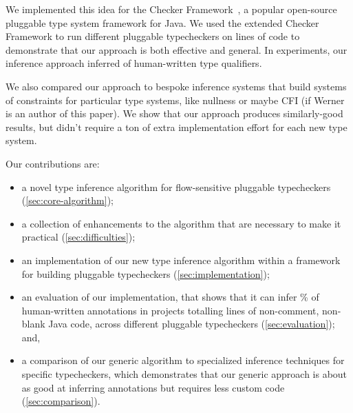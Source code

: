We implemented this idea for the Checker Framework~\cite{PapiACPE2008},
a popular open-source pluggable type system
framework for Java.
%
%
We used the extended Checker Framework to run  different pluggable typecheckers
on  lines of code to demonstrate that
our approach is both effective and general.
In experiments, our inference approach inferred  of human-written
type qualifiers.

We also compared our approach to bespoke inference systems that build
systems of constraints for particular type systems, like nullness or
maybe CFI (if Werner is an author of this paper). We show that our approach
produces similarly-good results, but didn't require a ton of extra
implementation effort for each new type system.

Our contributions are:
\begin{itemize}
\item a novel type inference algorithm for flow-sensitive pluggable
  typecheckers (\cref{sec:core-algorithm});
\item a collection of enhancements to the algorithm that are necessary to
  make it practical (\cref{sec:difficulties});
\item an implementation of our new type inference algorithm within a framework
  for building pluggable typecheckers (\cref{sec:implementation});
\item an evaluation of our implementation, that shows that it can infer
  \% of human-written annotations in  projects totalling
   lines of non-comment, non-blank Java code, across  different
  pluggable typecheckers (\cref{sec:evaluation}); and,
\item a comparison of our generic algorithm to specialized inference
  techniques for specific typecheckers, which demonstrates that our generic
  approach is about as good at inferring annotations but requires less
  custom code (\cref{sec:comparison}).
\end{itemize}

